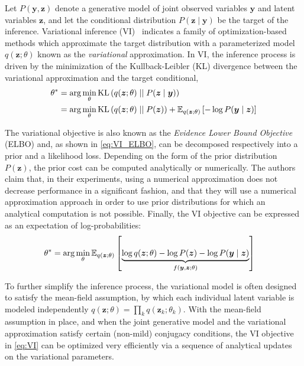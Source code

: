 \documentclass[11pt]{article}
\begin{document}
Let $P(\bm y, \bm z)$ denote a generative model of joint observed variables
$\bm y$ and latent variables $\bm z$, and let the conditional distribution
$P(\bm z\mid \bm y)$ be the target of the inference.  Variational inference
(VI)~\cite{blei_variational_2017} indicates a family of optimization-based
methods which approximate the target distribution with a parameterized model
$q(\bm z; \theta)$ known as the \emph{variational} approximation. In VI, the
inference process is driven by the minimization of the Kullback-Leibler (KL)
divergence between the variational approximation and the target conditional,
%
\begin{align}
  \theta^* &= \arg\min_\theta {\operatorname{KL}}\left( q(\bm z; \theta) \mid\mid P(\bm z\mid
  \bm y) \right) \\
  &= \arg\min_\theta {\operatorname{KL}}\left( q(\bm z; \theta) \mid\mid P(\bm z) \right)
  + {\mathbb{E}}_{q(\bm z; \theta)}\left[ -\log P(\bm y\mid \bm z) \right] \label{eq:VI_ELBO}
\end{align}

The variational objective is also known as the \emph{Evidence Lower Bound
Objective} (ELBO) and, as shown in \cref{eq:VI_ELBO}, can be decomposed
respectively into a prior and a likelihood loss.  Depending on the form of the
prior distribution $P(\bm z)$, the prior cost can be computed analytically or
numerically.  The authors claim that, in their experiments, using a numerical
approximation does not decrease performance in a significant fashion, and that
they will use a numerical approximation approach in order to use prior
distributions for which an analytical computation is not possible.  Finally,
the VI objective can be expressed as an expectation of log-probabilities:
%
\begin{align}
  \theta^* &= \arg\min_\theta {\mathbb{E}}_{q(\bm z; \theta)}\left[ \underbrace{\log
  q(\bm z; \theta) - \log P(\bm z) -\log P(\bm y\mid \bm z)}_{f(\bm y, \bm z;
  \theta)} \right] \label{eq:VI}
\end{align}

To further simplify the inference process, the variational model is often
designed to satisfy the mean-field assumption, by which each individual latent
variable is modeled independently $q(\bm z; \theta) = \prod_k q(\bm z_k;
\theta_k)$.  With the mean-field assumption in place, and when the joint
generative model and the variational approximation satisfy certain (non-mild)
conjugacy conditions, the VI objective in \cref{eq:VI} can be optimized very
efficiently via a sequence of analytical updates on the variational parameters.
\end{document}
